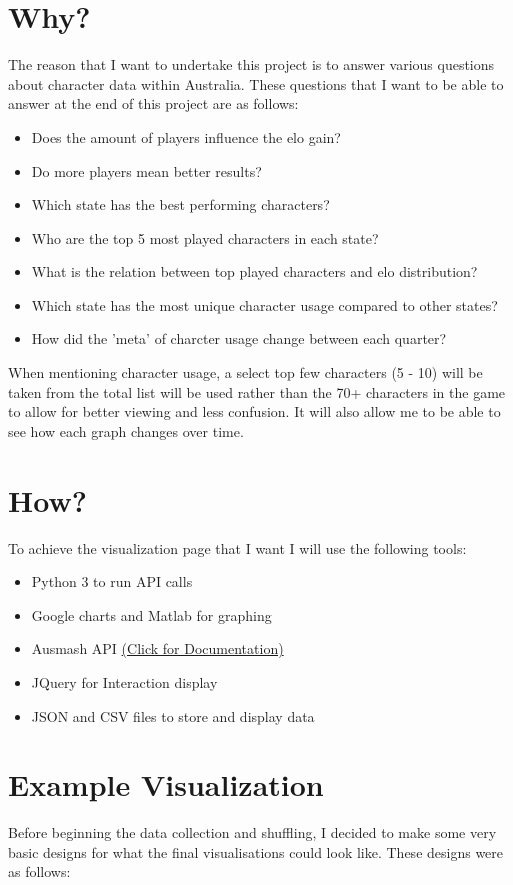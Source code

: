 \documentclass[11pt, oneside, a4paper]{article}
\begin{document}
\section*{Why?}
The reason that I want to undertake this project is to answer various questions about character data within Australia. These questions that I want to be able to answer at the end of this project are as follows:
\begin{itemize}
    \item Does the amount of players influence the elo gain?
    \item Do more players mean better results?
    \item Which state has the best performing characters?
    \item Who are the top 5 most played characters in each state?
    \item What is the relation between top played characters and elo distribution?
    \item Which state has the most unique character usage compared to other states?
    \item How did the 'meta' of charcter usage change between each quarter?
\end{itemize}
When mentioning character usage, a select top few characters (5 - 10) will be taken from the total list will be used rather than the 70+ characters in the game to allow for better viewing and less confusion. It will also allow me to be able to see how each graph changes over time.

\section*{How?}
To achieve the visualization page that I want I will use the following tools:
\begin{itemize}
    \item Python 3 to run API calls
    \item Google charts and Matlab for graphing
    \item Ausmash API \href{https://api.ausmash.com.au/swagger/ui/index#/}{(Click for Documentation)}
    \item JQuery for Interaction display
    \item JSON and CSV files to store and display data
\end{itemize}

\section*{Example Visualization}
Before beginning the data collection and shuffling, I decided to make some very basic designs for what the final visualisations could look like. These designs were as follows:
\end{document}
